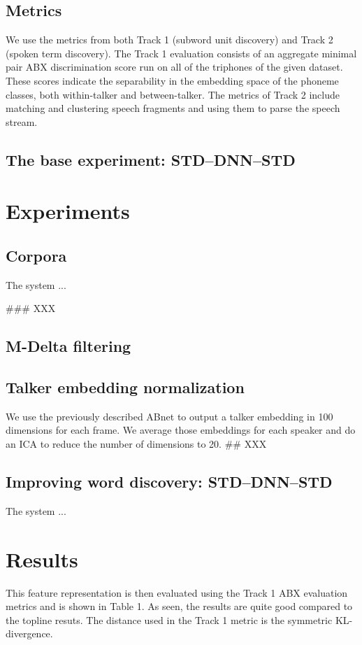 \documentclass[a4paper]{article}
\begin{document}
\subsection{Metrics}

We use the metrics from both Track 1 (subword unit discovery) and Track 2 (spoken term discovery). The Track 1 evaluation consists of an aggregate minimal pair ABX discrimination score run on all of the triphones of the given dataset. These scores indicate the separability in the embedding space of the phoneme classes, both within-talker and between-talker. The metrics of Track 2 include matching and clustering speech fragments and using them to parse the speech stream. 

\subsection{The base experiment: STD--DNN--STD}

\section{Experiments}

\subsection{Corpora}


The system ...

### XXX
\subsection{M-Delta filtering}
\subsection{Talker embedding normalization}
We use the previously described ABnet to output a talker embedding in 100 dimensions for each frame. We average those embeddings for each speaker and do an ICA to reduce the number of dimensions to 20. 
## XXX

\subsection{Improving word discovery: STD--DNN--STD}

The system ...

\section{Results}
This feature representation is then evaluated using the Track 1 ABX evaluation metrics and is shown in Table 1.
As seen, the results are quite good compared to the topline resuts. The distance used in the Track 1 metric is the symmetric KL-divergence.
\end{document}
